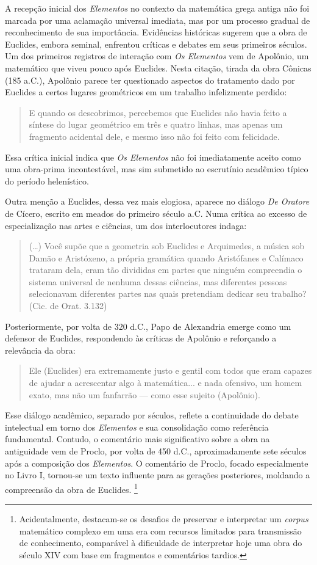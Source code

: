 \documentclass{hipatia}
\begin{document}
A recepção inicial dos \emph{Elementos} no contexto da
matemática grega antiga não foi marcada por uma
aclamação universal imediata, mas por um processo
gradual de reconhecimento de sua importância.
Evidências históricas sugerem que a obra de
Euclides, embora seminal, enfrentou críticas e
debates em seus primeiros séculos. Um dos
primeiros registros de interação com \emph{Os Elementos}
vem de Apolônio, um matemático que viveu pouco
após Euclides. Nesta citação, tirada da obra
Cônicas (185 a.C.), Apolônio parece ter
questionado aspectos do tratamento dado por
Euclides a certos lugares geométricos em um 
trabalho infelizmente perdido:
\begin{quote} 
	E quando os descobrimos, percebemos que Euclides
	não havia feito a síntese do lugar geométrico em
	três e quatro linhas, mas apenas um fragmento
	acidental dele, e mesmo isso não foi feito com
	felicidade.
\cite{jones2005} 
\end{quote} 
Essa crítica inicial indica que \emph{Os Elementos}
não foi imediatamente aceito como uma obra-prima
incontestável, mas sim submetido ao escrutínio
acadêmico típico do período helenístico.

Outra menção a Euclides, dessa vez mais elogiosa,
aparece no diálogo \emph{De Oratore} de Cícero, escrito
em meados do primeiro século a.C. Numa 
crítica ao excesso de especialização nas 
artes e ciências, um dos interlocutores indaga:
\begin{quote}
	(\dots) Você supõe que a geometria sob Euclides e
	Arquimedes, a música sob Damão e Aristóxeno,
	a própria gramática quando Aristófanes e Calímaco
	trataram dela, eram tão divididas em partes
	que ninguém compreendia o sistema universal 
	de nenhuma dessas ciências, mas diferentes 
	pessoas selecionavam diferentes partes nas 
	quais pretendiam dedicar seu trabalho?
	(Cic. de Orat. 3.132)
\end{quote}


Posteriormente, por volta de 320 d.C., Papo de
Alexandria emerge como um defensor de Euclides,
respondendo às críticas de Apolônio e reforçando a
relevância da obra:
\begin{quote}
	Ele (Euclides) era extremamente justo e gentil
	com todos que eram capazes de ajudar a
	acrescentar algo à matemática... e nada
	ofensivo, um homem exato, mas não um fanfarrão
	--- como esse sujeito (Apolônio).
	\cite{jones2005}
\end{quote}
Esse diálogo acadêmico, separado por séculos,
reflete a continuidade do debate intelectual em
torno dos \emph{Elementos} e sua consolidação como
referência fundamental. Contudo, o comentário mais
significativo sobre a obra na antiguidade vem de
Proclo, por volta de 450 d.C., aproximadamente
sete séculos após a composição dos \emph{Elementos}. O
comentário de Proclo, focado especialmente no
Livro I, tornou-se um texto influente para as
gerações posteriores, moldando a compreensão da
obra de Euclides. \footnote{Acidentalmente, destacam-se os
desafios de preservar e interpretar um
\emph{corpus} matemático complexo em uma era com
recursos limitados para transmissão de
conhecimento, comparável à dificuldade de
interpretar hoje uma obra do século XIV com base
em fragmentos e comentários tardios.}
\end{document}
